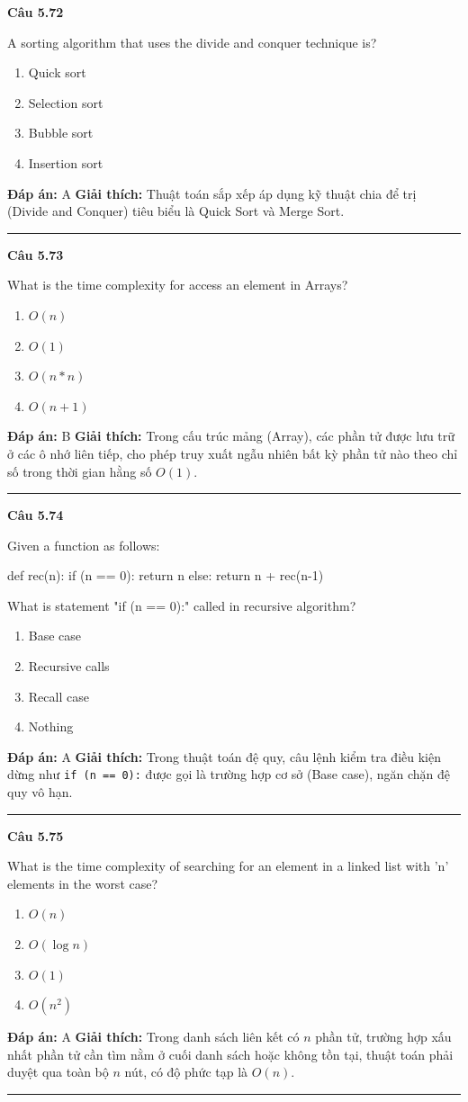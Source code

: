 \documentclass[11pt,a4paper]{article}
\newenvironment{question}[1]{%
  \par\vspace{1em}\noindent\textbf{\large Câu #1}\par\vspace{0.4em}
}{%
  \par\vspace{1em}\hrule\vspace{0.6em}
}
\newenvironment{choices}{%
  \begin{enumerate}[label=\textbf{\Alph*.},leftmargin=2.2em,itemsep=2pt,topsep=3pt]
}{%
  \end{enumerate}
}
\newcommand{\choice}{\item}
\newenvironment{codebox}{%
  \begin{tcolorbox}[colback=gray!8!white,colframe=gray!50!black,arc=1.5mm,boxrule=0.6pt,left=3mm,right=3mm,top=2.5mm,bottom=2.5mm]
  \ttfamily\small
}{%
  \end{tcolorbox}
}
\begin{document}
\begin{question}{5.72}
A sorting algorithm that uses the divide and conquer technique is?
\begin{choices}
\choice Quick sort
\choice Selection sort
\choice Bubble sort
\choice Insertion sort
\end{choices}
\textbf{Đáp án:} A
\textbf{Giải thích:} Thuật toán sắp xếp áp dụng kỹ thuật chia để trị (Divide and Conquer) tiêu biểu là Quick Sort và Merge Sort.
\end{question}

\begin{question}{5.73}
What is the time complexity for access an element in Arrays?
\begin{choices}
\choice $O(n)$
\choice $O(1)$
\choice $O(n * n)$
\choice $O(n + 1)$
\end{choices}
\textbf{Đáp án:} B
\textbf{Giải thích:} Trong cấu trúc mảng (Array), các phần tử được lưu trữ ở các ô nhớ liên tiếp, cho phép truy xuất ngẫu nhiên bất kỳ phần tử nào theo chỉ số trong thời gian hằng số $O(1)$.
\end{question}

\begin{question}{5.74}
Given a function as follows:
\begin{codebox}
def rec(n):
    if (n == 0):
        return n
    else:
        return n + rec(n-1)
\end{codebox}
What is statement "if (n == 0):" called in recursive algorithm?
\begin{choices}
\choice Base case
\choice Recursive calls
\choice Recall case
\choice Nothing
\end{choices}
\textbf{Đáp án:} A
\textbf{Giải thích:} Trong thuật toán đệ quy, câu lệnh kiểm tra điều kiện dừng như \texttt{if (n == 0):} được gọi là trường hợp cơ sở (Base case), ngăn chặn đệ quy vô hạn.
\end{question}

\begin{question}{5.75}
What is the time complexity of searching for an element in a linked list with 'n' elements in the worst case?
\begin{choices}
\choice $O(n)$
\choice $O(\log n)$
\choice $O(1)$
\choice $O(n^2)$
\end{choices}
\textbf{Đáp án:} A
\textbf{Giải thích:} Trong danh sách liên kết có $n$ phần tử, trường hợp xấu nhất phần tử cần tìm nằm ở cuối danh sách hoặc không tồn tại, thuật toán phải duyệt qua toàn bộ $n$ nút, có độ phức tạp là $O(n)$.
\end{question}
\end{document}
